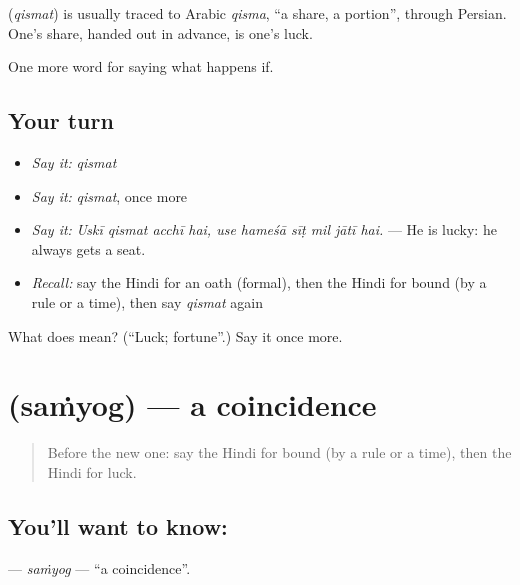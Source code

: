 \begin{cousinweb}
\textbf{} (\emph{qismat}) is usually traced to Arabic \emph{qisma}, \textquotedblleft{}a share, a portion\textquotedblright{}, through Persian. One's share, handed out in advance, is one's luck.
\end{cousinweb}

\begin{grammarlens}[title={What you've built}]
One more word for saying what happens if.
\end{grammarlens}

\subsection*{Your turn}
\begin{itemize}
\raggedright
  \item \emph{Say it:} \emph{qismat}
  \item \emph{Say it:} \emph{qismat}, once more
  \item \emph{Say it:} \emph{Uskī qismat acchī hai, use hameśā sīṭ mil jātī hai.} — He is lucky: he always gets a seat.
  \item \emph{Recall:} say the Hindi for an oath (formal), then the Hindi for bound (by a rule or a time), then say \emph{qismat} again
\end{itemize}

\begin{tcolorbox}[breakable,colback=teal!4,colframe=teal!35!black,title={Before you move on}]
What does  mean? (\textquotedblleft{}Luck; fortune\textquotedblright{}.) Say it once more.
\end{tcolorbox}
\section[\texorpdfstring{\hi{संयोग} (saṁyog)}{संयोग (saṁyog)}]{ (saṁyog) — a coincidence}

\label{lesson:HI-C544-samyog}



\begin{quote}
Before the new one: say the Hindi for bound (by a rule or a time), then the Hindi for luck.
\end{quote}

\subsection*{You'll want to know: }
\textbf{} — \emph{saṁyog} — \textquotedblleft{}a coincidence\textquotedblright{}.

